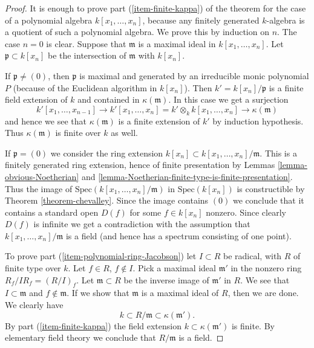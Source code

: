 \begin{proof}
It is enough to prove part (\ref{item-finite-kappa}) of
the theorem for the case of a polynomial
algebra $k[x_1, \ldots, x_n]$, because any finitely generated
$k$-algebra is a quotient of such a polynomial algebra.
We prove this by induction on $n$. The case $n = 0$ is clear.
Suppose that $\mathfrak m$ is a maximal ideal in $k[x_1, \ldots, x_n]$.
Let $\mathfrak p \subset k[x_n]$ be the intersection
of $\mathfrak m$ with $k[x_n]$.

\medskip\noindent
If $\mathfrak p \not = (0)$,
then $\mathfrak p$ is maximal and generated by an irreducible
monic polynomial $P$ (because of the Euclidean algorithm
in $k[x_n]$). Then
$k' = k[x_n]/\mathfrak p$ is a finite field extension of $k$
and contained in $\kappa(\mathfrak m)$. In this case
we get a surjection
$$
k'[x_1, \ldots, x_{n-1}]
\to
k'[x_1, \ldots, x_n] =
k' \otimes_k k[x_1, \ldots, x_n]
\longrightarrow
\kappa(\mathfrak m)
$$
and hence we see that $\kappa(\mathfrak m)$ is a finite
extension  of $k'$ by induction hypothesis. Thus $\kappa(\mathfrak m)$
is finite over $k$ as well.

\medskip\noindent
If $\mathfrak p = (0)$ we consider the ring
extension $k[x_n] \subset k[x_1, \ldots, x_n]/\mathfrak m$.
This is a finitely generated ring extension, hence
of finite presentation by
Lemmas \ref{lemma-obvious-Noetherian} and
\ref{lemma-Noetherian-finite-type-is-finite-presentation}.
Thus the image of $\text{Spec}(k[x_1, \ldots, x_n]/\mathfrak m)$
in $\text{Spec}(k[x_n])$ is constructible by
Theorem \ref{theorem-chevalley}. Since the image
contains $(0)$ we conclude that it contains a standard
open $D(f)$ for some $f\in k[x_n]$ nonzero. Since clearly
$D(f)$ is infinite we get a contradiction with the
assumption that $k[x_1, \ldots, x_n]/\mathfrak m$ is
a field (and hence has a spectrum consisting of one point).

\medskip\noindent
To prove part (\ref{item-polynomial-ring-Jacobson}) let
$I \subset R$ be radical, with $R$ of finite type over $k$.
Let $f \in R$, $f \not \in I$. Pick a maximal ideal $\mathfrak m'$
in the nonzero ring $R_f/IR_f = (R/I)_f$. Let $\mathfrak m \subset R$
be the inverse image of $\mathfrak m'$ in $R$. We see that
$I \subset \mathfrak m$
and $f \not \in \mathfrak m$. If we show that $\mathfrak m$ is a maximal
ideal of $R$, then we are done. We clearly have
$$
k \subset R/\mathfrak m \subset \kappa(\mathfrak m').
$$
By part (\ref{item-finite-kappa}) the field extension
$k \subset \kappa(\mathfrak m')$
is finite. By elementary field theory we conclude that $R/\mathfrak m$
is a field.
\end{proof}

